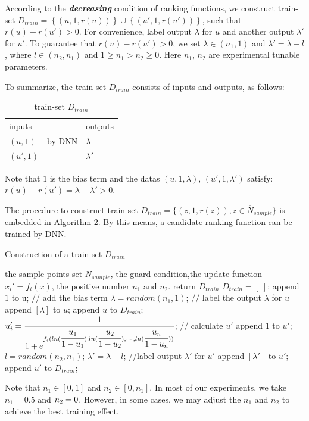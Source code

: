 According to the \textbf{\emph{decreasing}} condition of ranking functions, we construct train-set ${D_{train}} = \left\{ {(u,1,r(u))} \right\} \cup \left\{ {(u',1,r(u'))} \right\}$, such that $r(u) - r(u') > 0$.
For convenience, label output $\lambda$ for $u$ and another output $\lambda'$ for $u'$. To guarantee that $r(u) - r(u') > 0$, we set $\lambda  \in ({n_1},1)$ and $\lambda ' = \lambda  - l$, where $l \in ({n_2},{n_1})$ and $1 \ge {n_1} > {n_2}\ge 0$. Here $n_1$, $n_2$ are experimental tunable parameters. 

To summarize, the train-set $D_{train}$ consists of inputs and outputs, as follows:
\begin{table}[H]{\label{Dtrain}}
	\begin{center}
		\setlength{\abovecaptionskip}{0pt}   
		\setlength{\belowcaptionskip}{0pt}
		\caption{train-set $D_{train}$}
		\begin{tabular}{|l|l|l|}
			\hline
			\cline{1-1} \cline{3-3}
			inputs & \multirow{3}{*}{by DNN} & outputs   \\ \cline{1-1} \cline{3-3} 
			$(u,1)$  &                                     & $\lambda$  \\ \cline{1-1} \cline{3-3} 
			$(u',1)$ &                                     & $\lambda'$ \\ \cline{1-1} \cline{3-3} \hline
		\end{tabular}
	\end{center}
\end{table}
Note that $1$ is the bias term and the datas $(u,1,\lambda)$, $(u',1,\lambda')$ satisfy: $r(u)-r(u')=\lambda-\lambda'>0$.

The procedure to construct train-set ${D_{train}} = \{ (z,1,r(z)),z \in \overline N_{sample}\} $ is embedded in Algorithm 2. By this means, a candidate ranking function can be trained by DNN.
\begin{algorithm}[H] 
	\label{algorithm2}
	\caption{Construction of a train-set $D_{train}$}
	\begin{algorithmic}[1] %
		\Require the sample points set $N_{sample}$, the guard condition,the update function $x_{i}'=f_{i}(x)$, the positive number $n_{1}$ and $n_{2}$.          
		\Ensure return $D_{train}$
		\State $D_{train}=[\;]$;
		\State append $1$ to u; // add the bias term
		\State $\lambda=random(n_{1},1)$; // label the output $\lambda$ for $u$
		\State append $[\lambda]$ to $u$;
		\State append $u$ to $D_{train}$;
		\State $u_{i}'=\cfrac{1}{1+e^{f_{i}(ln(\cfrac{u_{1}}{1-u_{1}}),ln(\cfrac{u_{2}}{1-u_{2}}),\cdots,ln(\cfrac{u_{n}}{1-u_{n}}))}}$; // calculate $u'$
		\State append $1$ to $u'$;
		\State $l = random({n_2},{n_1})$;
		\State $\lambda'=\lambda-l$; //label output $\lambda'$ for $u'$
		\State append $[\lambda']$ to $u'$;
		\State append $u'$ to $D_{train}$;
		\EndFor
		\State {}
	\end{algorithmic}
\end{algorithm}
Note that ${n_1} \in [0,1]$ and ${n_2} \in [0,{n_1}]$. In most of our experiments, we take ${n_1} = 0.5$ and ${n_{\rm{2}}} = 0$. However, in some cases, we may adjust the ${n_1}$ and ${n_2}$ to achieve the best training effect.

